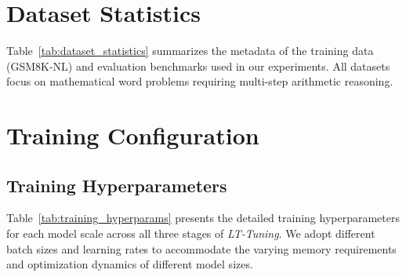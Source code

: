 \documentclass{article}
\theoremstyle{plain}
\theoremstyle{definition}
\theoremstyle{remark}
\begin{document}



\newpage
\appendix
\onecolumn

\section{Dataset Statistics}
\label{app:meta}

Table~\ref{tab:dataset_statistics} summarizes the metadata of the training data (GSM8K-NL) and evaluation benchmarks used in our experiments. All datasets focus on mathematical word problems requiring multi-step arithmetic reasoning.

\begin{table}[h]
\centering
{}
\caption{Statistics of the evaluation datasets used in our experiments.}
\label{tab:dataset_statistics}
\end{table}

\section{Training Configuration}
\label{app:training}

\subsection{Training Hyperparameters}

Table~\ref{tab:training_hyperparams} presents the detailed training hyperparameters for each model scale across all three stages of \textit{LT-Tuning}. We adopt different batch sizes and learning rates to accommodate the varying memory requirements and optimization dynamics of different model sizes.
\end{document}
